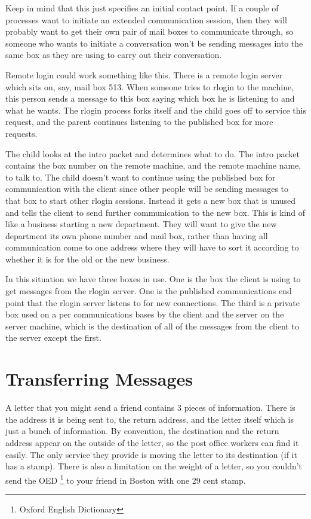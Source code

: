 Keep in mind that this just specifies an initial contact point.  If a couple
of processes want to initiate an extended communication session, then they
will probably want to get their own pair of mail boxes to communicate through,
so someone who wants to initiate a conversation won't be sending messages into
the same box as they are using to carry out their conversation.

Remote login could work something like this.  There is a remote login server
which sits on, say, mail box 513.  When someone tries to rlogin to the
machine, this person sends a message to this box saying which box he is
listening to and what he wants.  The rlogin process forks itself and the
child goes off to service this request, and the parent continues listening
to the published box for more requests.

The child looks at the intro packet and determines what to do.  The intro
packet contains the box number on the remote machine, and the remote machine
name, to talk to.
The child doesn't want to continue using the published box for communication
with the client since other people will be sending messages to that box to
start other rlogin sessions.  Instead it gets a new box that is unused and
tells the client to send further communication to the new box.  This
is kind of like a business starting a new department.  They will want to
give the new department its own phone number and mail box, rather than
having all communication come to one address where they will have to sort
it according to whether it is for the old or the new business.

In this situation we have three boxes in use.  One is the box the client is
using to get messages from the rlogin server.  One is the published
communications end point that the rlogin server listens to for new
connections.  The third is a private box used on a per communications
bases by the client and the server on the server machine, which is the
destination of all of the messages from the client to the server except
the first.

\section{Transferring Messages}

A letter that you might send a friend contains 3 pieces of information.  There
is the address it is being sent to, the return address, and the letter itself
which is just a bunch of information.  By convention, the destination and
the return address appear on the outside of the letter, so the post office
workers can find it easily.  The only service they provide is moving the
letter to its destination (if it has a stamp).  There is also a limitation
on the weight of a letter, so you couldn't send the OED
\footnote{Oxford English Dictionary} to your friend in
Boston with one 29 cent stamp.

